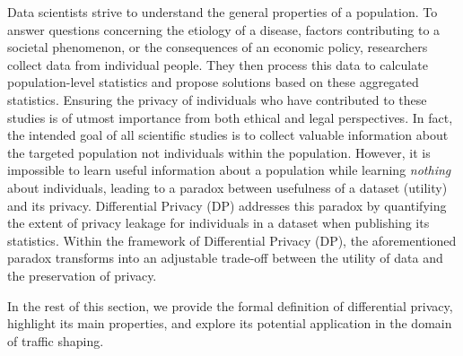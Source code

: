 Data scientists strive to understand the general properties of a population. 
To answer questions concerning the etiology of a disease, factors contributing to a societal phenomenon, or the consequences of an economic policy, researchers collect data from individual people. They then process this data to calculate population-level statistics and propose solutions based on these aggregated statistics.
Ensuring the privacy of individuals who have contributed to these studies is of utmost importance from both ethical and legal perspectives.
In fact, the intended goal of all scientific studies is to collect valuable information about the targeted population not individuals within the population. 
However, it is impossible to learn useful information about a population while learning \textit{nothing} about individuals, leading to a paradox between usefulness of a dataset (\ie utility) and its privacy. 
Differential Privacy (DP) addresses this paradox by quantifying the extent of privacy leakage for individuals in a dataset when publishing its statistics.
Within the framework of Differential Privacy (DP), the aforementioned paradox transforms into an adjustable trade-off between the utility of data and the preservation of privacy. 

In the rest of this section, we provide the formal definition of differential privacy, highlight its main properties, and explore its potential application in the domain of traffic shaping.


%
%


